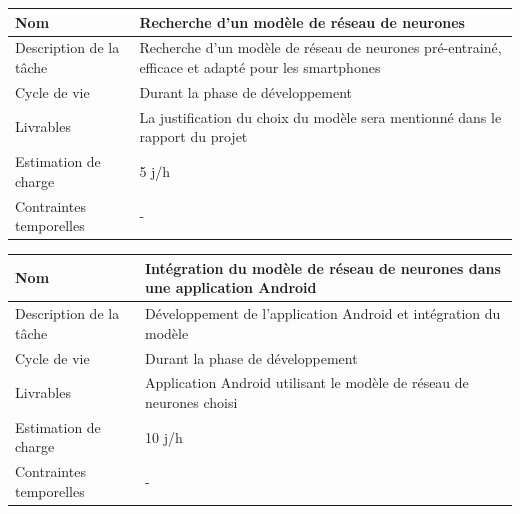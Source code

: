 \documentclass[CDS,UTF8,final]{EPURapport}
\begin{document}
\begin{table}[h!]
\centering
\begin{tabular}{|p{4cm}|p{10cm}|}
\hline
Nom                     & Recherche d'un modèle de réseau de neurones                                                       \\ \hline
Description de la tâche & Recherche d'un modèle de réseau de neurones pré-entrainé, efficace et adapté pour les smartphones \\ \hline
Cycle de vie            & Durant la phase de développement                                                                  \\ \hline
Livrables               & La justification du choix du modèle sera mentionné dans le rapport du projet                      \\ \hline
Estimation de charge    & 5 j/h                                                                                             \\ \hline
Contraintes temporelles & -                                                                                                 \\ \hline
\end{tabular}
\end{table}
\par

\begin{table}[h!]
\centering
\begin{tabular}{|p{4cm}|p{10cm}|}
\hline
Nom                     & Intégration du modèle de réseau de neurones dans une application Android \\ \hline
Description de la tâche & Développement de l'application Android et intégration du modèle          \\ \hline
Cycle de vie            & Durant la phase de développement                                         \\ \hline
Livrables               & Application Android utilisant le modèle de réseau de neurones choisi     \\ \hline
Estimation de charge    & 10 j/h                                                                   \\ \hline
Contraintes temporelles & -                                                                        \\ \hline
\end{tabular}
\end{table}
\par
\end{document}
